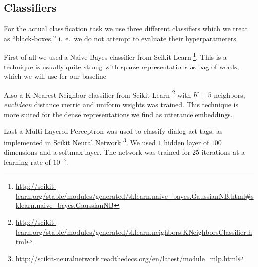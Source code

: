 



\subsection{Classifiers}
For the actual classification task we use three different classifiers which we treat as ``black-boxes,'' i.\ e.\ we do not attempt to evaluate their hyperparameters. 

First of all we used a Naive Bayes classifier  from Scikit Learn \footnote{\url{http://scikit-learn.org/stable/modules/generated/sklearn.naive_bayes.GaussianNB.html#sklearn.naive_bayes.GaussianNB}}. This is a technique is usually quite strong with sparse representations as bag of words, which we will use for our baseline 

Also a K-Nearest Neighbor classifier from Scikit Learn \footnote{\url{http://scikit-learn.org/stable/modules/generated/sklearn.neighbors.KNeighborsClassifier.html}} with $K=5$ neighbors, \emph{euclidean} distance metric and uniform weights was trained. This technique is more suited for the dense representations we find as utterance embeddings.

Last a Multi Layered Perceptron was used to classify dialog act tags, as implemented in Scikit Neural Network \footnote{\url{http://scikit-neuralnetwork.readthedocs.org/en/latest/module_mlp.html}}. We used $1$ hidden layer of $100$ dimensions and a softmax layer. The network was trained for 25 iterations at a learning rate of $10^{-3}$.
